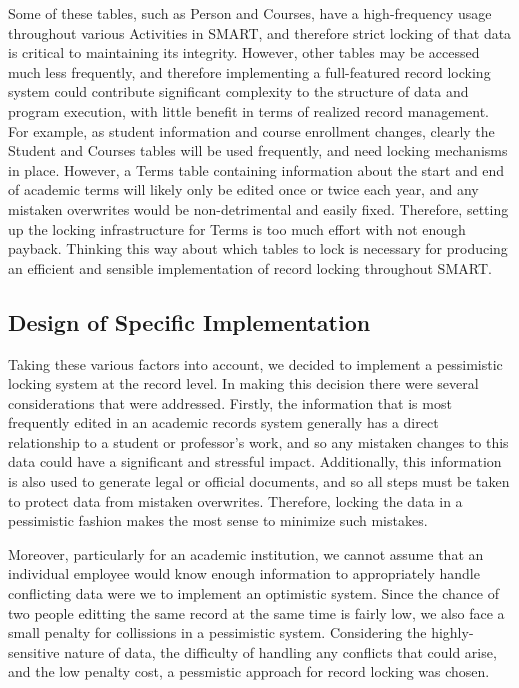 \documentclass[12pt]{article}
\begin{document}
Some of these tables, such as Person and Courses, have a high-frequency usage throughout various Activities in SMART, and therefore strict locking of that data is critical to maintaining its integrity. However, other tables may be accessed much less frequently, and therefore implementing a full-featured record locking system could contribute significant complexity to the structure of data and program execution, with little benefit in terms of realized record management. For example, as student information and course enrollment changes, clearly the Student and Courses tables will be used frequently, and need locking mechanisms in place. However, a Terms table containing information about the start and end of academic terms will likely only be edited once or twice each year, and any mistaken overwrites would be non-detrimental and easily fixed. Therefore, setting up the locking infrastructure for Terms is too much effort with not enough payback. Thinking this way about which tables to lock is necessary for producing an efficient and sensible implementation of record locking throughout SMART.

\subsection{Design of Specific Implementation}

Taking these various factors into account, we decided to implement a pessimistic locking system at the record level. In making this decision there were several considerations that were addressed. Firstly, the information that is most frequently edited in an academic records system generally has a direct relationship to a student or professor's work, and so any mistaken changes to this data could have a significant and stressful impact. Additionally, this information is also used to generate legal or official documents, and so all steps must be taken to protect data from mistaken overwrites. Therefore, locking the data in a pessimistic fashion makes the most sense to minimize such mistakes. 

Moreover, particularly for an academic institution, we cannot assume that an individual employee would know enough information to appropriately handle conflicting data were we to implement an optimistic system. Since the chance of two people editting the same record at the same time is fairly low, we also face a small penalty for collissions in a pessimistic system. Considering the highly-sensitive nature of data, the difficulty of handling any conflicts that could arise, and the low penalty cost, a pessmistic approach for record locking was chosen.
\end{document}
